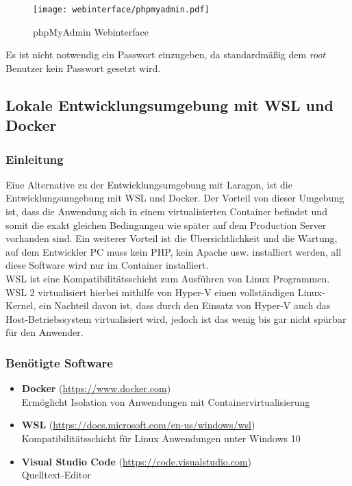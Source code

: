 \begin{figure}[H]
  \centering
  \texttt{[image: webinterface/phpmyadmin.pdf]}
  \caption{phpMyAdmin Webinterface}
\end{figure}

Es ist nicht notwendig ein Passwort einzugeben, da standardmäßig dem
\textit{root} Benutzer kein Passwort gesetzt wird.

\subsection{Lokale Entwicklungsumgebung mit WSL und Docker}
\subsubsection{Einleitung}
Eine Alternative zu der Entwicklungsumgebung mit Laragon, ist die
Entwicklungsumgebung mit WSL und Docker. Der Vorteil von dieser Umgebung ist,
dass die Anwendung sich in einem virtualisierten Container befindet und somit
die exakt gleichen Bedingungen wie später auf dem Production Server vorhanden
sind. Ein weiterer Vorteil ist die Übersichtlichkeit und die Wartung, auf dem
Entwickler PC muss kein PHP, kein Apache usw. installiert werden, all diese
Software wird nur im Container installiert.\\

\ac*{WSL} ist eine Kompatibilitätsschicht zum Ausführen von Linux Programmen.
WSL 2 virtualisiert hierbei mithilfe von Hyper-V einen vollständigen
Linux-Kernel, ein Nachteil davon ist, dass durch den Einsatz von Hyper-V auch
das Host-Betriebssystem virtualisiert wird, jedoch ist das wenig bis gar nicht
spürbar für den Anwender.

\subsubsection{Benötigte Software}

\begin{itemize}
  \item \textbf{Docker} (\url{https://www.docker.com}) \\ Ermöglicht Isolation
        von Anwendungen mit Containervirtualisierung
  \item \textbf{WSL} (\url{https://docs.microsoft.com/en-us/windows/wsl}) \\
        Kompatibilitätsschicht für Linux Anwendungen unter Windows 10
  \item \textbf{Visual Studio Code} (\url{https://code.visualstudio.com}) \\
        Quelltext-Editor
\end{itemize}


